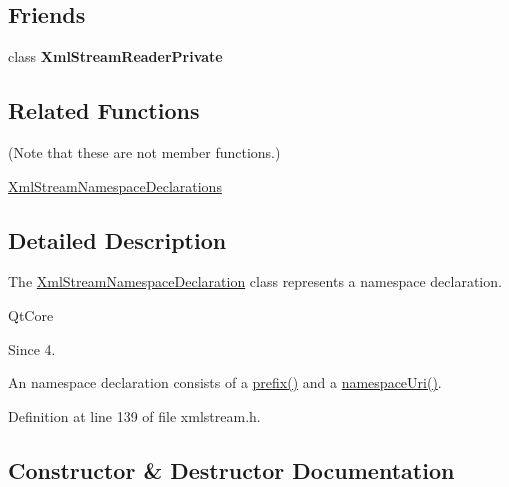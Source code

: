 \subsection*{Friends}
\begin{DoxyCompactItemize}
\item 
\mbox{\label{class_xml_stream_namespace_declaration_a07cbe8adea255c3bb802811c3872de83}} 
class {\bfseries Xml\+Stream\+Reader\+Private}
\end{DoxyCompactItemize}
\subsection*{Related Functions}
(Note that these are not member functions.) \begin{DoxyCompactItemize}
\item 
\hyperlink{class_xml_stream_namespace_declaration_a79ff04192c4a4b6ac757799375b0ce50}{Xml\+Stream\+Namespace\+Declarations}
\end{DoxyCompactItemize}


\subsection{Detailed Description}
The \hyperlink{class_xml_stream_namespace_declaration}{Xml\+Stream\+Namespace\+Declaration} class represents a namespace declaration. 

Qt\+Core \begin{DoxySince}{Since}
4. 
\end{DoxySince}
An namespace declaration consists of a \hyperlink{class_xml_stream_namespace_declaration_a84440d3a55f8679da78032e02a49ccbd}{prefix()} and a \hyperlink{class_xml_stream_namespace_declaration_ac2d6510eeacc33073402389403e2c3ef}{namespace\+Uri()}. 

Definition at line 139 of file xmlstream.\+h.



\subsection{Constructor \& Destructor Documentation}
\mbox{\label{class_xml_stream_namespace_declaration_a7d6716e210ce5ee3dea6ed914117368d}} 
